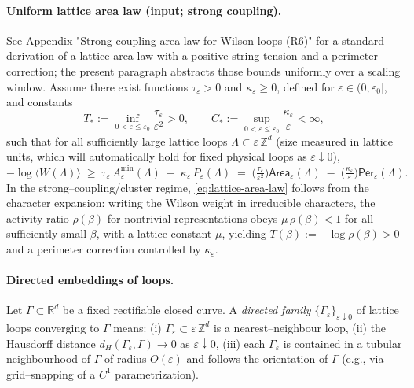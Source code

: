 \documentclass[11pt]{amsart}
\theoremstyle{plain}
\theoremstyle{definition}
\theoremstyle{remark}
\begin{document}
\paragraph{Uniform lattice area law (input; strong coupling).}
See Appendix "Strong-coupling area law for Wilson loops (R6)" for a standard derivation of a lattice area law with a positive string tension and a perimeter correction; the present paragraph abstracts those bounds uniformly over a scaling window.
Assume there exist functions $\tau_\varepsilon>0$ and $\kappa_\varepsilon\ge 0$, defined for $\varepsilon\in (0,\varepsilon_0]$, and constants
\[
  T_*:=\inf_{0<\varepsilon\le\varepsilon_0}\frac{\tau_\varepsilon}{\varepsilon^2}>0,\qquad
  C_*:=\sup_{0<\varepsilon\le\varepsilon_0}\frac{\kappa_\varepsilon}{\varepsilon}<\infty,
\]
such that for all sufficiently large lattice loops $\Lambda\subset\varepsilon\,\mathbb{Z}^d$ (size measured in lattice units, which will automatically hold for fixed physical loops as $\varepsilon\downarrow 0$),
\begin{equation}
\label{eq:lattice-area-law}
  -\log\langle W(\Lambda)\rangle \;\ge\; \tau_\varepsilon\,A_\varepsilon^{\min}(\Lambda)\;-
  \;\kappa_\varepsilon\,P_\varepsilon(\Lambda)
  \;=\;\Big(\tfrac{\tau_\varepsilon}{\varepsilon^2}\Big)\mathsf{Area}_\varepsilon(\Lambda)\;-
  \;\Big(\tfrac{\kappa_\varepsilon}{\varepsilon}\Big)\mathsf{Per}_\varepsilon(\Lambda).
\end{equation}
In the strong--coupling/cluster regime, \eqref{eq:lattice-area-law} follows from the character expansion: writing the Wilson weight in irreducible characters, the activity ratio $\rho(\beta)$ for nontrivial representations obeys $\mu\,\rho(\beta) < 1$ for all sufficiently small $\beta$, with a lattice constant $\mu$, yielding $T(\beta):= -\log \rho(\beta) > 0$ and a perimeter correction controlled by $\kappa_\varepsilon$.

\paragraph{Directed embeddings of loops.}
Let $\Gamma\subset\mathbb{R}^d$ be a fixed rectifiable closed curve. A \emph{directed family} $\{\Gamma_\varepsilon\}_{\varepsilon\downarrow 0}$ of lattice loops converging to $\Gamma$ means: (i) $\Gamma_\varepsilon\subset\varepsilon\,\mathbb{Z}^d$ is a nearest--neighbour loop, (ii) the Hausdorff distance $d_H(\Gamma_\varepsilon,\Gamma)\to 0$ as $\varepsilon\downarrow 0$, (iii) each $\Gamma_\varepsilon$ is contained in a tubular neighbourhood of $\Gamma$ of radius $O(\varepsilon)$ and follows the orientation of $\Gamma$ (e.g., via grid--snapping of a $C^1$ parametrization).
\end{document}
